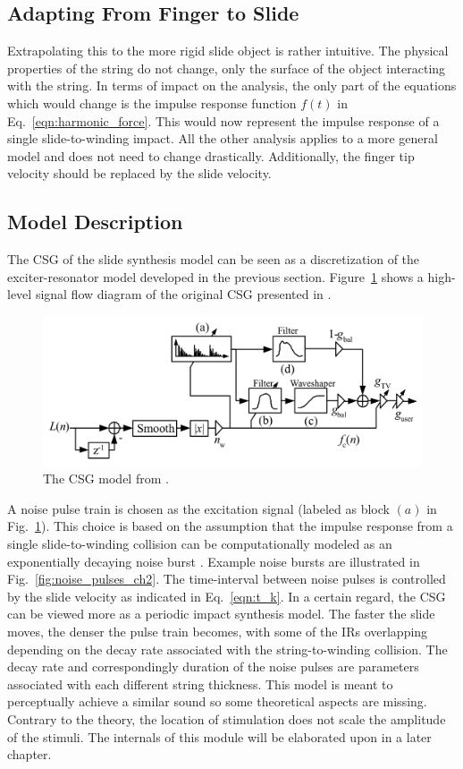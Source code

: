 \documentclass[main.tex]{subfiles}
\begin{document}
\subsection{Adapting From Finger to Slide}
Extrapolating this to the more rigid slide object is rather intuitive. The physical properties of the string do not change, only the surface of the object interacting with the string. In terms of impact on the analysis, the only part of the equations which would change is the impulse response function $f(t)$ in Eq.~\ref{eqn:harmonic_force}. This would now represent the impulse response of a single slide-to-winding impact. All the other analysis applies to a more general model and does not need to change drastically. Additionally, the finger tip velocity should be replaced by the slide velocity.

\subsection{Model Description}
The CSG of the slide synthesis model can be seen as a discretization of the exciter-resonator model developed in the previous section. Figure~\ref{fig:original_CSG} shows a high-level signal flow diagram of the original CSG presented in . 
\begin{figure}[h]
    \centering
    \includegraphics[scale=.50]{./images/pictures/CSG_original.PNG}
    \caption{The CSG model from .}
    \label{fig:original_CSG}
\end{figure}
A noise pulse train is chosen as the excitation signal (labeled as block $(a)$ in Fig.~\ref{fig:original_CSG}). This choice is based on the assumption that the impulse response from a single slide-to-winding collision can be computationally modeled as an exponentially decaying noise burst . Example noise bursts are illustrated in Fig.~\ref{fig:noise_pulses_ch2}. The time-interval between noise pulses is controlled by the slide velocity as indicated in Eq.~\ref{eqn:t_k}. In a certain regard, the CSG can be viewed more as a periodic impact synthesis model. The faster the slide moves, the denser the pulse train becomes, with some of the IRs overlapping depending on the decay rate associated with the string-to-winding collision. The decay rate and correspondingly duration of the noise pulses are parameters associated with each different string thickness. This model is meant to perceptually achieve a similar sound so some theoretical aspects are missing. Contrary to the theory, the location of stimulation does not scale the amplitude of the stimuli. The internals of this module will be elaborated upon in a later chapter.
\end{document}
